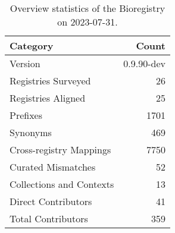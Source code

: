 \begin{table}
\caption{Overview statistics of the Bioregistry on 2023-07-31.}
\label{tab:bioregistry-summary}
\begin{tabular}{lr}
\toprule
Category & Count \\
\midrule
Version & 0.9.90-dev \\
Registries Surveyed & 26 \\
Registries Aligned & 25 \\
Prefixes & 1701 \\
Synonyms & 469 \\
Cross-registry Mappings & 7750 \\
Curated Mismatches & 52 \\
Collections and Contexts & 13 \\
Direct Contributors & 41 \\
Total Contributors & 359 \\
\bottomrule
\end{tabular}
\end{table}
